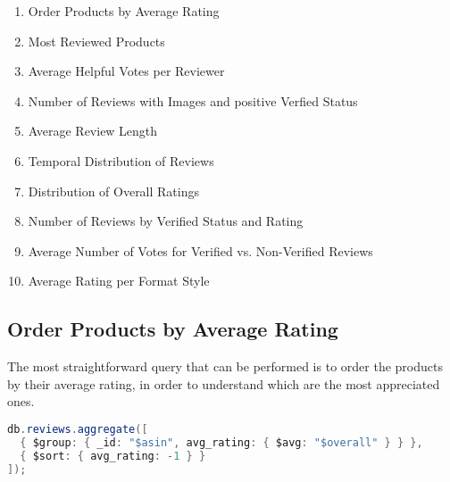\begin{enumerate}
    \item Order Products by Average Rating
    \item Most Reviewed Products
    \item Average Helpful Votes per Reviewer
    \item Number of Reviews with Images and positive Verfied Status
    \item Average Review Length
    \item Temporal Distribution of Reviews
    \item Distribution of Overall Ratings
    \item Number of Reviews by Verified Status and Rating
    \item Average Number of Votes for Verified vs. Non-Verified Reviews
    \item Average Rating per Format Style
\end{enumerate}

\subsection{Order Products by Average Rating}
The most straightforward query that can be performed is to order the products by their average rating, in order to understand which are the most appreciated ones. \\
\begin{lstlisting}[language=Java]
db.reviews.aggregate([
  { $group: { _id: "$asin", avg_rating: { $avg: "$overall" } } },
  { $sort: { avg_rating: -1 } }
]);
\end{lstlisting}
